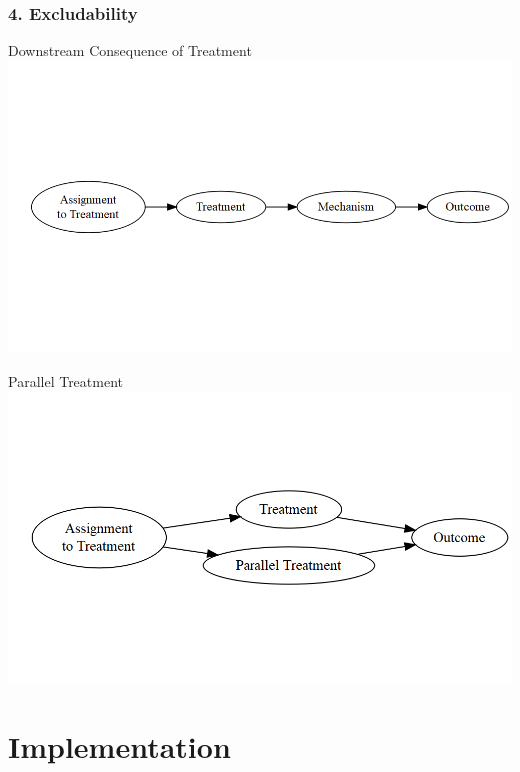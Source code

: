 \documentclass[xcolor=x11names,compress]{beamer}\usepackage[]{graphicx}\usepackage[]{color}
\makeatletter
\def\maxwidth{ %
  \ifdim\Gin@nat@width>\linewidth
    \linewidth
  \else
    \Gin@nat@width
  \fi
}
\newenvironment{knitrout}{}{} %
\renewcommand{\(}{\begin{columns}}
\renewcommand{\)}{\end{columns}}
\newcommand{\<}[1]{\begin{column}{#1}}
\renewcommand{\>}{\end{column}}
\makeatother
\begin{document}
\begin{frame}
\frametitle{4. Excludability}
\begin{multicols}{2}
Downstream Consequence of Treatment
\begin{knitrout}
\color{fgcolor}
\includegraphics[width=\maxwidth]{figure/Excludability1-1} 

\end{knitrout}
\columnbreak
\pause
Parallel Treatment
\begin{knitrout}
\color{fgcolor}
\includegraphics[width=\maxwidth]{figure/Excludability2-1} 

\end{knitrout}
\end{multicols}
\end{frame}

\section{Implementation}
\end{document}
